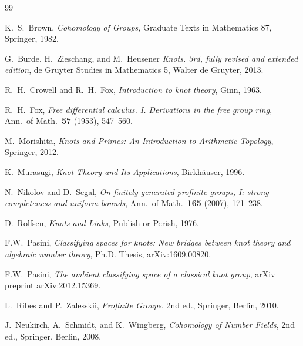 \documentclass[11pt]{article}
\begin{document}
\begin{thebibliography}{99}

K.~S.~Brown,
\textit{Cohomology of Groups},
Graduate Texts in Mathematics 87,
Springer, 1982.

G.~Burde, H.~Zieschang, and M.~Heusener
\textit{Knots. 3rd, fully revised and extended edition},
de Gruyter Studies in Mathematics 5,
Walter de Gruyter, 2013.

R.~H.~Crowell and R.~H.~Fox,
\textit{Introduction to knot theory},
Ginn,
1963.        

R.~H.~Fox,
\textit{Free differential calculus. I. Derivations in the free group ring},
Ann.\ of Math.\ \textbf{57} (1953), 547--560.

M.~Morishita,
\textit{Knots and Primes: An Introduction to Arithmetic Topology},
Springer, 2012.

K.~Murasugi,
\textit{Knot Theory and Its Applications},
Birkh\"auser, 1996.

N.~Nikolov and D.~Segal, \textit{On finitely generated profinite groups, I: strong completeness and uniform bounds}, 
Ann.\ of Math.\ \textbf{165} (2007), 171--238.

D.~Rolfsen,
\textit{Knots and Links},
Publish or Perish, 1976.

F.W.~Pasini,
\textit{Classifying spaces for knots: New bridges between knot theory and algebraic number theory},
Ph.D. Thesis, arXiv:1609.00820.

F.W.~Pasini,
\textit{The ambient classifying space of a classical knot group},
arXiv preprint arXiv:2012.15369.

L.~Ribes and P.~Zalesskii,
\textit{Profinite Groups},
2nd ed., Springer, Berlin, 2010.

J.~Neukirch, A.~Schmidt, and K.~Wingberg,
\textit{Cohomology of Number Fields},
2nd ed., Springer, Berlin, 2008.

\end{thebibliography}
\end{document}
